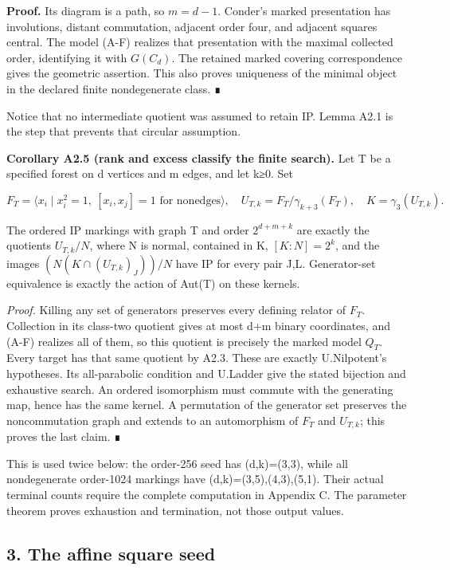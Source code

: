 \documentclass[
  11pt,
  a4paper,
]{article}
\newcounter{none} %
\begin{document}
\textbf{Proof.} Its diagram is a path, so \(m=d-1\). Conder's marked
presentation has involutions, distant commutation, adjacent order four,
and adjacent squares central. The model (A-F) realizes that presentation
with the maximal collected order, identifying it with \(G(C_d)\). The
retained marked covering correspondence gives the geometric assertion.
This also proves uniqueness of the minimal object in the declared finite
nondegenerate class. ∎

Notice that no intermediate quotient was assumed to retain IP. Lemma
A2.1 is the step that prevents that circular assumption.

\textbf{Corollary A2.5 (rank and excess classify the finite search).}
Let T be a specified forest on d vertices and m edges, and let k≥0. Set

\[
 F_T=\langle x_i\mid x_i^2=1,\ [x_i,x_j]=1\text{ for nonedges}\rangle,
 \quad U_{T,k}=F_T/\gamma_{k+3}(F_T),\quad K=\gamma_3(U_{T,k}).
\]

The ordered IP markings with graph T and order \(2^{d+m+k}\) are exactly
the quotients \(U_{T,k}/N\), where N is normal, contained in K,
\([K:N]=2^k\), and the images \((N(K\cap(U_{T,k})_J))/N\) have IP for
every pair J,L. Generator-set equivalence is exactly the action of
Aut(T) on these kernels.

\emph{Proof.} Killing any set of generators preserves every defining
relator of \(F_T\). Collection in its class-two quotient gives at most
d+m binary coordinates, and (A-F) realizes all of them, so this quotient
is precisely the marked model \(Q_T\). Every target has that same
quotient by A2.3. These are exactly U.Nilpotent's hypotheses. Its
all-parabolic condition and U.Ladder give the stated bijection and
exhaustive search. An ordered isomorphism must commute with the
generating map, hence has the same kernel. A permutation of the
generator set preserves the noncommutation graph and extends to an
automorphism of \(F_T\) and \(U_{T,k}\); this proves the last claim. ∎

This is used twice below: the order-256 seed has (d,k)=(3,3), while all
nondegenerate order-1024 markings have (d,k)=(3,5),(4,3),(5,1). Their
actual terminal counts require the complete computation in Appendix C.
The parameter theorem proves exhaustion and termination, not those
output values.

\subsection{3. The affine square seed}\label{the-affine-square-seed}
\end{document}
